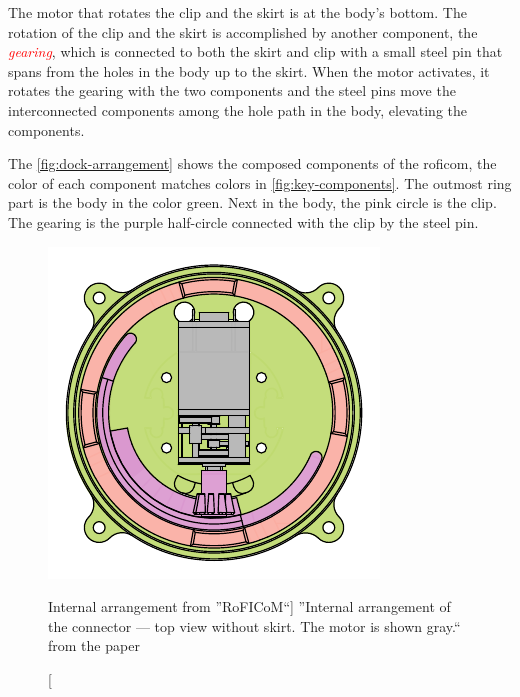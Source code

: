 \documentclass[
  digital,     %
  oneside,     %
  nosansbold,  %
  nocolorbold, %
  nolof,         %
  nolot,         %
]{fithesis4}
\newcommand{\TODO}[1]{\textcolor{red}{\textit{#1}}}
\begin{document}
The motor that rotates the clip and the skirt is at the body's bottom. The rotation of the clip and the skirt is accomplished by another component, the \TODO{gearing}, which is connected to both the skirt and clip with a small steel pin that spans from the holes in the body up to the skirt. When the motor activates, it rotates the gearing with the two components and the steel pins move the interconnected components among the hole path in the body, elevating the components.

The \autoref{fig:dock-arrangement} shows the composed components of the \acrshort{roficom}, the color of each component matches colors in \autoref{fig:key-components}. The outmost ring part is the body in the color green. Next in the body, the pink circle is the clip. The gearing is the purple half-circle connected with the clip by the steel pin.

\begin{figure}
    \centering
    \includegraphics{ assets/dock-arrangement.pdf }
    \caption[Internal arrangement from ''RoFICoM``]{ ''Internal arrangement of the connector --- top view
    without skirt. The motor is shown gray.`` from the paper \cite{MrazekBarnat2019Roficom} }
    \label{fig:dock-arrangement}
\end{figure}

\end{document}

